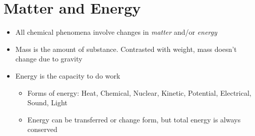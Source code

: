 \documentclass[12pt, openany, letterpaper]{memoir}
\begin{document}
\section{Matter and Energy}
\begin{itemize}
	\item All chemical phenomena involve changes in \emph{matter} and/or \emph{energy}
	\item Mass is the amount of substance. Contrasted with weight, mass doesn't change due to gravity
	\item Energy is the capacity to do work
	      \begin{itemize}
		      \item Forms of energy: Heat, Chemical, Nuclear, Kinetic, Potential, Electrical, Sound, Light
		      \item Energy can be transferred or change form, but total energy is always conserved
	      \end{itemize}
\end{itemize}
\end{document}
